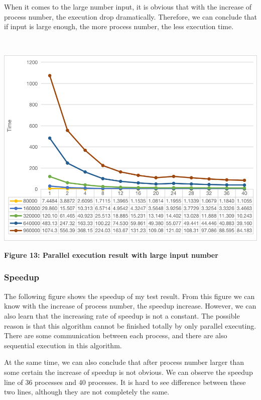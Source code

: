 When it comes to the large number input, it is obvious that with the increase of process number, the execution drop dramatically. Therefore, we can conclude that if input is large enough, the more process number, the less execution time.

~\\
\centerline {\includegraphics[scale = 1, width=14cm]{large_data}}
\centerline{\textbf {Figure 13: Parallel execution result with large input number}}

\subsubsection{Speedup}

The following figure shows the speedup of my test result. From this figure we can know with the increase of process number, the speedup increase. However, we can also learn that the increasing rate of speedup is not a constant. The possible reason is that this algorithm cannot be finished totally by only parallel executing. There are some communication between each process, and there are also sequential execution in this algorithm. 

At the same time, we can also conclude that after process number larger than some certain the increase of speedup is not obvious. We can observe the speedup line of 36 processes and 40 processes. It is hard to see difference between these two lines, although they are not completely the same.


